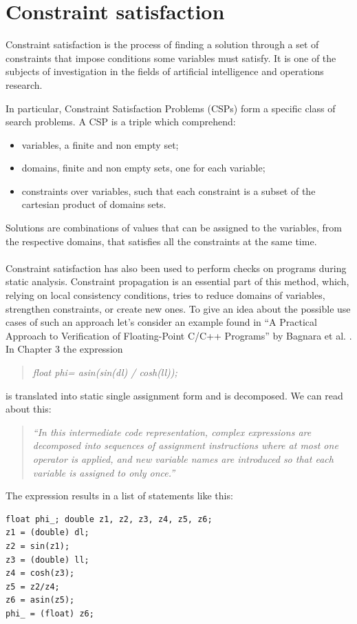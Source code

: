 \section{Constraint satisfaction}
Constraint satisfaction is the process of finding a solution through a set of constraints that impose conditions some variables must satisfy.
It is one of the subjects of investigation in the fields of artificial intelligence and operations research.

In particular, Constraint Satisfaction Problems (CSPs) form a specific class of search problems. A CSP is a triple which comprehend:
\begin{itemize}
  \item variables, a finite and non empty set;
  \item domains, finite and non empty sets, one for each variable;
  \item constraints over variables, such that each constraint is a subset of the cartesian product of domains sets.
\end{itemize}
Solutions are combinations of values that can be assigned to the variables, from the respective domains, that satisfies all the constraints at the same time.
\\\\
Constraint satisfaction has also been used to perform checks on programs during static analysis.
Constraint propagation is an essential part of this method, which, relying on local consistency conditions, tries to reduce domains of variables, strengthen constraints, or create new ones. 
To give an idea about the possible use cases of such an approach let's consider an example found in ``A Practical Approach to Verification of Floating-Point C/C++ Programs'' by Bagnara et al. \cite{10.1145/3410875}. 
In Chapter 3 the expression
\begin{quote}
\itshape
float phi\textunderscore = asin(sin(dl) / cosh(ll));
\end{quote}
is translated into static single assignment form and is decomposed. We can read about this:
\begin{quote}
\itshape
``In this intermediate code representation, complex expressions are decomposed into sequences of assignment instructions where at most one operator is applied, and new variable names are introduced so that each variable is assigned to only once.''
\end{quote}
The expression results in a list of statements like this:
\begin{lstlisting}
float phi_; double z1, z2, z3, z4, z5, z6;
z1 = (double) dl;
z2 = sin(z1);
z3 = (double) ll;
z4 = cosh(z3);
z5 = z2/z4;
z6 = asin(z5);
phi_ = (float) z6;	
\end{lstlisting}
